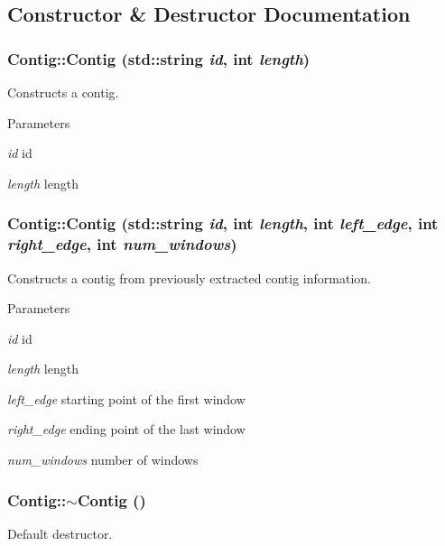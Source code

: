 \subsection{Constructor \& Destructor Documentation}
\hypertarget{classContig_abe1938f8abac2eed8350479b0ab2990d}{
\subsubsection[{Contig}]{\setlength{\rightskip}{0pt plus 5cm}Contig::Contig (std::string {\em id}, \/  int {\em length})}}
\label{classContig_abe1938f8abac2eed8350479b0ab2990d}


Constructs a contig. 
\begin{DoxyParams}{Parameters}
\item[{\em id}]id \item[{\em length}]length \end{DoxyParams}
\hypertarget{classContig_a56e3c05b8d1bba09b873df68ea119873}{
\subsubsection[{Contig}]{\setlength{\rightskip}{0pt plus 5cm}Contig::Contig (std::string {\em id}, \/  int {\em length}, \/  int {\em left\_\-edge}, \/  int {\em right\_\-edge}, \/  int {\em num\_\-windows})}}
\label{classContig_a56e3c05b8d1bba09b873df68ea119873}


Constructs a contig from previously extracted contig information. 
\begin{DoxyParams}{Parameters}
\item[{\em id}]id \item[{\em length}]length \item[{\em left\_\-edge}]starting point of the first window \item[{\em right\_\-edge}]ending point of the last window \item[{\em num\_\-windows}]number of windows \end{DoxyParams}
\hypertarget{classContig_a1e51c10e7db2939f1dc600ca20ec5e2b}{
\subsubsection[{$\sim$Contig}]{\setlength{\rightskip}{0pt plus 5cm}Contig::$\sim$Contig ()}}
\label{classContig_a1e51c10e7db2939f1dc600ca20ec5e2b}
Default destructor. 

